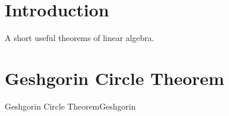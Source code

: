 \section{Introduction}
A short useful theorems of linear algebra.
\section{Geshgorin Circle Theorem}
\begin{thm}{Geshgorin Circle Theorem}{Geshgorin}
\end{thm}